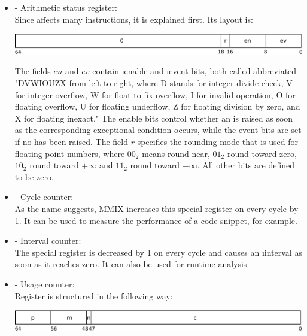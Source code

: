\begin{itemize}
	\item {} - Arithmetic status register:\\
	Since  affects many instructions, it is explained first. Its layout is:
	
	\includegraphics[width=\linewidth]{img/rA-crop.pdf}
	
	The fields $en$ and $ev$ contain \i{enable} and \i{event} bits, both called abbreviated "DVWIOUZX from left to right, where D stands for integer divide check, V for integer overflow, W for float-to-fix overflow, I for invalid operation, O for floating overflow, U for floating underflow, Z for floating division by zero, and X for floating inexact." \citep[pg. 26]{mmix-doc}
	The enable bits control whether an  is raised as soon as the corresponding exceptional condition occurs, while the event bits are set if no  has been raised.
	The field $r$ specifies the rounding mode that is used for floating point numbers, where $00_2$ means round near, $01_2$ round toward zero, $10_2$ round toward $+\infty$ and $11_2$ round toward $-\infty$. All other bits are defined to be zero. \citep[pg. 15 and 26]{mmix-doc}
	
	\item {} - Cycle counter:\\
	As the name suggests, MMIX increases this special register on every cycle by 1. It can be used to measure the performance of a code snippet, for example. \citep[pg. 32]{mmix-doc}
	\item {} - Interval counter:\\
	The special register  is decreased by 1 on every cycle and causes an \i{interval } as soon as it reaches zero. It can also be used for runtime analysis. \citep[pg. 32]{mmix-doc}
	\item {} - Usage counter:\\
	Register  is structured in the following way:
	
	\includegraphics[width=\linewidth]{img/rU-crop.pdf}
	

\end{itemize}
